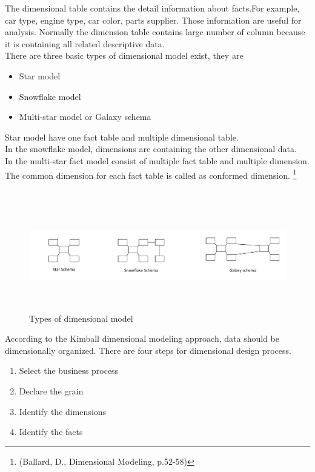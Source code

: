 The dimensional table contains the detail information about facts.For example, car type, engine type, car color, parts supplier. Those information are useful for analysis. Normally the dimension table contains large number of column because it is containing all related descriptive data. \\
There are three basic types of dimensional model exist, they are
\begin{itemize}
\item Star model
\item Snowflake model
\item Multi-star model or Galaxy schema
\end{itemize}
Star model have one fact table and multiple dimensional table.\\
In the snowflake model, dimensions are containing the other dimensional data.\\
In the multi-star fact model consist of  multiple fact table and multiple dimension. The common dimension for each fact table is called as conformed dimension. \footnote{(Ballard, D., Dimensional Modeling, p.52-58)} \\\\
\begin{figure}[!ht] 
	\centering
		\includegraphics[width=pt, height=134pt, width=1.0\textwidth]{images/todm.pdf}
	\caption[Types of dimensional model]{Types of dimensional model\footnotemark}
	\label{fig:TODM }
\end{figure}

According to the Kimball dimensional modeling approach, data should be dimensionally organized. There are four steps for dimensional design process.
\begin{enumerate}
\item Select the business process 
\item Declare the grain
\item Identify the dimensions
\item Identify the facts
\end{enumerate}

